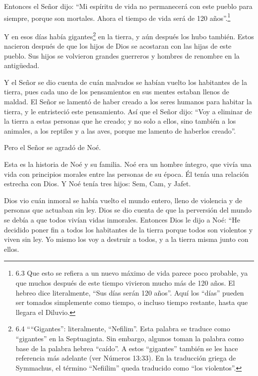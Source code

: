 Entonces el Señor dijo: ``Mi espíritu de vida no
permanecerá con este pueblo para siempre, porque son mortales. Ahora el
tiempo de vida será de 120 años''.\footnote{6.3 Que esto se refiera a un
  nuevo máximo de vida parece poco probable, ya que muchos después de
  este tiempo vivieron mucho más de 120 años. El hebreo dice
  literalmente, ``Sus días serán 120 años''. Aquí los ``días'' pueden
  ser tomados simplemente como tiempo, o incluso tiempo restante, hasta
  que llegara el Diluvio.}

 Y en esos días había gigantes\footnote{6.4 ````Gigantes'':
  literalmente, ``Nefilim''. Esta palabra se traduce como ``gigantes''
  en la Septuaginta. Sin embargo, algunos toman la palabra como base de
  la palabra hebrea ``caído''. A estos ``gigantes'' también se les hace
  referencia más adelante (ver Números 13:33). En la traducción griega
  de Symmachus, el término ``Nefiilim'' queda traducido como ``los
  violentos''.} en la tierra, y aún después los hubo también. Estos
nacieron después de que los hijos de Dios se acostaran con las hijas de
este pueblo. Sus hijos se volvieron grandes guerreros y hombres de
renombre en la antigüedad.

 Y el Señor se dio cuenta de cuán malvados se habían vuelto
los habitantes de la tierra, pues cada uno de los pensamientos en sus
mentes estaban llenos de maldad.  El Señor se lamentó de
haber creado a los seres humanos para habitar la tierra, y le
entristeció este pensamiento.  Así que el Señor dijo: ``Voy
a eliminar de la tierra a estas personas que he creado; y no solo a
ellos, sino también a los animales, a los reptiles y a las aves, porque
me lamento de haberlos creado''.

 Pero el Señor se agradó de Noé.

 Esta es la historia de Noé y su familia. Noé era un hombre
íntegro, que vivía una vida con principios morales entre las personas de
su época. Él tenía una relación estrecha con Dios.  Y Noé
tenía tres hijos: Sem, Cam, y Jafet.

 Dios vio cuán inmoral se había vuelto el mundo entero,
lleno de violencia y de personas que actuaban sin ley. 
Dios se dio cuenta de que la perversión del mundo se debía a que todos
vivían vidas inmorales.  Entonces Dios le dijo a Noé: ``He
decidido poner fin a todos los habitantes de la tierra porque todos son
violentos y viven sin ley. Yo mismo los voy a destruir a todos, y a la
tierra misma junto con ellos.


